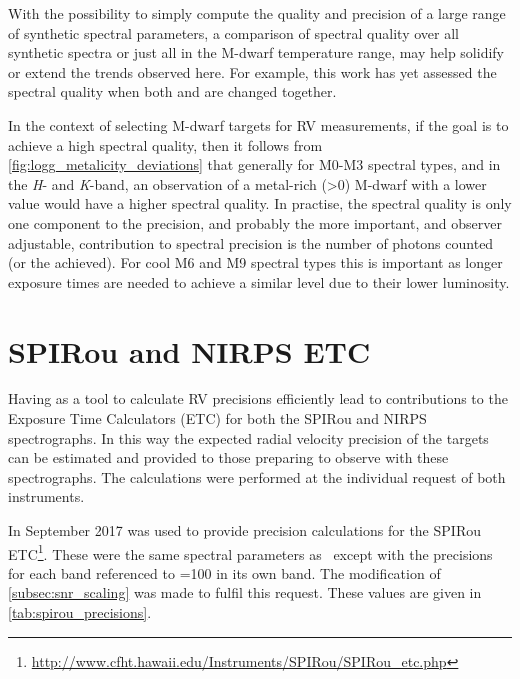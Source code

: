 With the possibility to simply compute the quality and precision of a large range of synthetic spectral parameters, a comparison of spectral quality over all synthetic spectra or just all in the M-dwarf temperature range, may help solidify or extend the trends observed here. For example, this work has yet assessed the spectral quality when both \feh{} and \Logg{} are changed together.

In the context of selecting M-dwarf targets for {RV} measurements, if the goal is to achieve a high spectral quality, then it follows from \cref{fig:logg_metalicity_deviations} that generally for {M0}-M3 spectral types, and in the \emph{H}- and \emph{K}-band, an observation of a metal-rich (\feh{}>0) M-dwarf with a lower \Logg{} value would have a higher spectral quality.
In practise, the spectral quality is only one component to the precision, and probably the more important, and observer adjustable,  contribution to spectral precision is the number of photons counted (or the \snr{} achieved).
For cool {M6} and {M9} spectral types this is important as longer exposure times are needed to achieve a similar \snr{} level due to their lower luminosity.


\section{{SPIRou} and {NIRPS} {ETC}}
\label{sec:spirou_nirps_etc}
Having \eniric{} as a tool to calculate {RV} precisions efficiently lead to contributions to the Exposure Time Calculators (ETC) for both the {SPIRou} and {NIRPS} spectrographs.
In this way the expected radial velocity precision of the targets can be estimated and provided to those preparing to observe with these spectrographs.
The calculations were performed at the individual request of both instruments.

In September 2017 \eniric{} was used to provide precision calculations for the {SPIRou} ETC\footnote{\href{http://www.cfht.hawaii.edu/Instruments/SPIRou/SPIRou_etc.php}{\url{http://www.cfht.hawaii.edu/Instruments/SPIRou/SPIRou\_etc.php}}}.
These were the same spectral parameters as~\citet{figueira_radial_2016} except with the precisions for each band referenced to {\snr{}=100} in its own band.
The modification of \cref{subsec:snr_scaling} was made to fulfil this request.
These values are given in \cref{tab:spirou_precisions}.

